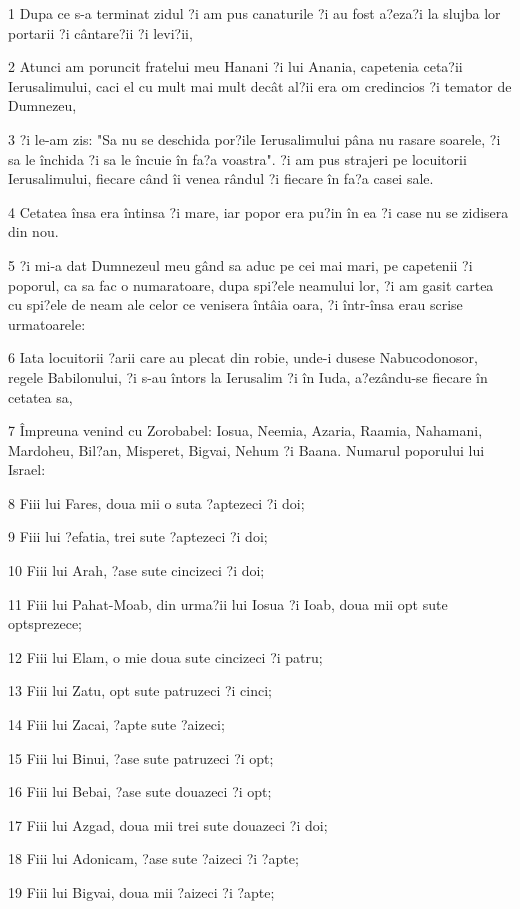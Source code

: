 \par 1 Dupa ce s-a terminat zidul ?i am pus canaturile ?i au fost a?eza?i la slujba lor portarii ?i cântare?ii ?i levi?ii,
\par 2 Atunci am poruncit fratelui meu Hanani ?i lui Anania, capetenia ceta?ii Ierusalimului, caci el cu mult mai mult decât al?ii era om credincios ?i temator de Dumnezeu,
\par 3 ?i le-am zis: "Sa nu se deschida por?ile Ierusalimului pâna nu rasare soarele, ?i sa le închida ?i sa le încuie în fa?a voastra". ?i am pus strajeri pe locuitorii Ierusalimului, fiecare când îi venea rândul ?i fiecare în fa?a casei sale.
\par 4 Cetatea însa era întinsa ?i mare, iar popor era pu?in în ea ?i case nu se zidisera din nou.
\par 5 ?i mi-a dat Dumnezeul meu gând sa aduc pe cei mai mari, pe capetenii ?i poporul, ca sa fac o numaratoare, dupa spi?ele neamului lor, ?i am gasit cartea cu spi?ele de neam ale celor ce venisera întâia oara, ?i într-însa erau scrise urmatoarele:
\par 6 Iata locuitorii ?arii care au plecat din robie, unde-i dusese Nabucodonosor, regele Babilonului, ?i s-au întors la Ierusalim ?i în Iuda, a?ezându-se fiecare în cetatea sa,
\par 7 Împreuna venind cu Zorobabel: Iosua, Neemia, Azaria, Raamia, Nahamani, Mardoheu, Bil?an, Misperet, Bigvai, Nehum ?i Baana. Numarul poporului lui Israel:
\par 8 Fiii lui Fares, doua mii o suta ?aptezeci ?i doi;
\par 9 Fiii lui ?efatia, trei sute ?aptezeci ?i doi;
\par 10 Fiii lui Arah, ?ase sute cincizeci ?i doi;
\par 11 Fiii lui Pahat-Moab, din urma?ii lui Iosua ?i Ioab, doua mii opt sute optsprezece;
\par 12 Fiii lui Elam, o mie doua sute cincizeci ?i patru;
\par 13 Fiii lui Zatu, opt sute patruzeci ?i cinci;
\par 14 Fiii lui Zacai, ?apte sute ?aizeci;
\par 15 Fiii lui Binui, ?ase sute patruzeci ?i opt;
\par 16 Fiii lui Bebai, ?ase sute douazeci ?i opt;
\par 17 Fiii lui Azgad, doua mii trei sute douazeci ?i doi;
\par 18 Fiii lui Adonicam, ?ase sute ?aizeci ?i ?apte;
\par 19 Fiii lui Bigvai, doua mii ?aizeci ?i ?apte;
